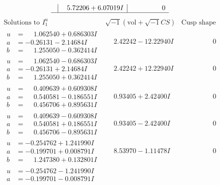 \documentclass[1p]{elsarticle_modified}
\theoremstyle{definition}
\newcommand{\I}{\sqrt{-1}}
\begin{document}
$$\begin{array}{c|c|c}
 & \phantom{-}5.72206 + 6.07019 I & \phantom{-0.000000 } 0\\
 \hline 
 \end{array}$$\newpage$$\begin{array}{c|c|c}  
\text{Solutions to }I^u_{1}& \I (\text{vol} + \sqrt{-1}CS) & \text{Cusp shape}\\
 \hline 
\begin{aligned}
u &= \phantom{-}1.062540 + 0.686303 I \\
a &= -0.26131 - 2.14684 I \\
b &= \phantom{-}1.255050 - 0.362414 I\end{aligned}
 & \phantom{-}2.42242 - 12.22940 I & \phantom{-0.000000 } 0 \\ \hline\begin{aligned}
u &= \phantom{-}1.062540 - 0.686303 I \\
a &= -0.26131 + 2.14684 I \\
b &= \phantom{-}1.255050 + 0.362414 I\end{aligned}
 & \phantom{-}2.42242 + 12.22940 I & \phantom{-0.000000 } 0 \\ \hline\begin{aligned}
u &= \phantom{-}0.409639 + 0.609308 I \\
a &= \phantom{-}0.540581 - 0.186551 I \\
b &= \phantom{-}0.456706 + 0.895631 I\end{aligned}
 & \phantom{-}0.93405 + 2.42400 I & \phantom{-0.000000 } 0 \\ \hline\begin{aligned}
u &= \phantom{-}0.409639 - 0.609308 I \\
a &= \phantom{-}0.540581 + 0.186551 I \\
b &= \phantom{-}0.456706 - 0.895631 I\end{aligned}
 & \phantom{-}0.93405 - 2.42400 I & \phantom{-0.000000 } 0 \\ \hline\begin{aligned}
u &= -0.254762 + 1.241990 I \\
a &= -0.199701 + 0.008791 I \\
b &= \phantom{-}1.247380 + 0.132801 I\end{aligned}
 & \phantom{-}8.53970 - 1.11478 I & \phantom{-0.000000 } 0 \\ \hline\begin{aligned}
u &= -0.254762 - 1.241990 I \\
a &= -0.199701 - 0.008791 I \\

\end{aligned}
\end{array}$$
\end{document}

